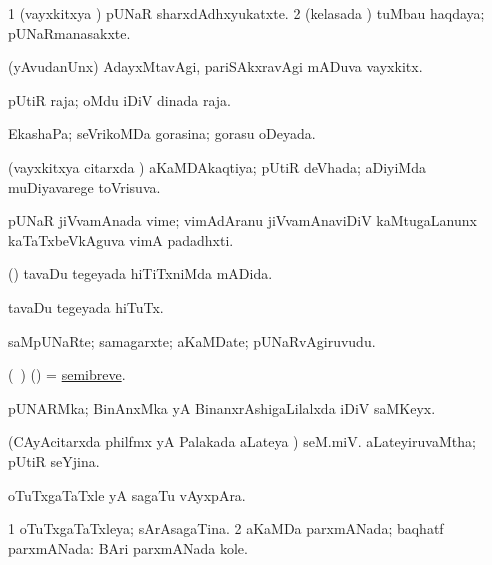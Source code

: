 \bentry
{}
\gl{\nA}
\bmng
\bnum
\num{1} (vayxkitxya \vi) pUNaR sharxdAdhxyukatxte. 
\num{2} (kelasada \vi) tuMbau haqdaya; pUNaRmanasakxte. 
\enum
\emng
\eentry

\bentry
{}
\gl{\nA}
\bmng
(yAvudanUnx) AdayxMtavAgi, pariSAkxravAgi mADuva vayxkitx. 
\emng
\eentry

\bentry
{}
\gl{\nA}
\bmng
pUtiR raja; oMdu iDiV dinada raja. 
\emng
\eentry

\bentry
{} 
\gl{\gu}
\expl{}
\bmng
EkashaPa; seVrikoMDa gorasina; gorasu oDeyada. 
\emng
\eentry

\bentry
{}
\gl{\gu}
\bmng
(vayxkitxya citarxda \vi) aKaMDAkaqtiya; pUtiR deVhada; aDiyiMda muDiyavarege toVrisuva. 
\emng
\eentry

\bentry
{}
\gl{\nA}
\bmng
pUNaR jiVvamAnada vime; vimAdAranu jiVvamAnaviDiV kaMtugaLanunx kaTaTxbeVkAguva vimA padadhxti. 
\emng
\eentry

\bentry
{}
\gl{\gu}
\bmng
(\birx) tavaDu tegeyada hiTiTxniMda mADida. 
\emng
\eentry

\bentry
{}
\gl{\nA}
\bmng
tavaDu tegeyada hiTuTx. 
\emng
\eentry

\bentry
{}
\gl{\nA}
\bmng
saMpUNaRte; samagarxte; aKaMDate; pUNaRvAgiruvudu. 
\emng
\eentry

\bentry
{}
\gl{\nA}
\bmng
(\kanmu\ \ame) (\saM) = \hyperref{kandict_s.pdf}{S}{semibreve}{semibreve}. 
\emng
\eentry

\bentry
{}
\gl{\nA}
\bmng
pUNARMka; BinAnxMka yA BinanxrAshigaLilalxda iDiV saMKeyx. 
\emng
\eentry

\bentry
{} 
\gl{\gu}
\expl{}
\bmng
(CAyAcitarxda philfmx yA Palakada aLateya \vi)  seM.miV. aLateyiruvaMtha; pUtiR seYjina. 
\emng
\eentry

\bentry
{} 
\gl{\nA}
\expl{}
\bmng
oTuTxgaTaTxle yA sagaTu vAyxpAra. 
\emng
\eentry

\bentry
{} 
\gl{\gu}
\bmng
\bnum
\num{1} oTuTxgaTaTxleya; sArAsagaTina. 
\num{2} aKaMDa parxmANada; baqhatf parxmANada:  BAri parxmANada kole. 
\enum
\emng
\eentry

